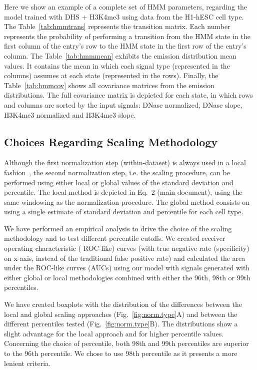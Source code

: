 \documentclass{bioinfo}
\begin{document}
Here we show an example of a complete set of HMM parameters,
regarding the model trained with DHS + H3K4me3 using data from the
H1-hESC cell type. The Table~\ref{tab:hmmtrans} represents the transition
matrix. Each number represents the probability of performing a
transition from the HMM state in the first column of the entry's
row to the HMM state in the first row of the entry's column. The
Table~\ref{tab:hmmmean} exhibits the emission distribution mean values.
It contains the mean in which each signal type (represented in the columns)
assumes at each state (represented in the rows). Finally, the
Table~\ref{tab:hmmcov} shows all covariance matrices from the emission
distributions. The full covariance matrix is depicted for each state,
in which rows and columns are sorted by the input signals: DNase normalized,
DNase slope, H3K4me3 normalized and H3K4me3 slope.

\subsection{Choices Regarding Scaling Methodology}
\label{sec:hmm.norm.test}

Although the first normalization step (within-dataset) is always used in a local
fashion~\citep{boyle2011}, the second normalization step, i.e. the scaling procedure,
can be performed using either local or global values of the standard deviation and percentile.
The local method is depicted in Eq.~2 (main document), using the same windowing as
the normalization procedure. The global method consists on using a single estimate of
standard deviation and percentile for each cell type.

We have performed an empirical analysis to drive the choice of the scaling
methodology and to test different percentile cutoffs. We created receiver
operating characteristic ({\color{black} ROC-like}) curves {\color{black} (with
true negative rate (specificity) on x-axis, instead of the traditional false
positive rate)} and calculated the area under the {\color{black} ROC-like}
curves (AUCs) using our model with signals generated with either global or
local methodologies combined with either the 96th, 98th or 99th percentiles.

We have created boxplots with the distribution of the differences between the local
and global scaling approaches (Fig.~\ref{fig:norm.type}A) and between the different
percentiles tested (Fig.~\ref{fig:norm.type}B). The distributions show a slight
advantage for the local approach and for higher percentile values. Concerning the
choice of percentile, both 98th and 99th percentiles are superior to the 96th
percentile. We chose to use 98th percentile as it presents a more lenient criteria. 
\end{document}
